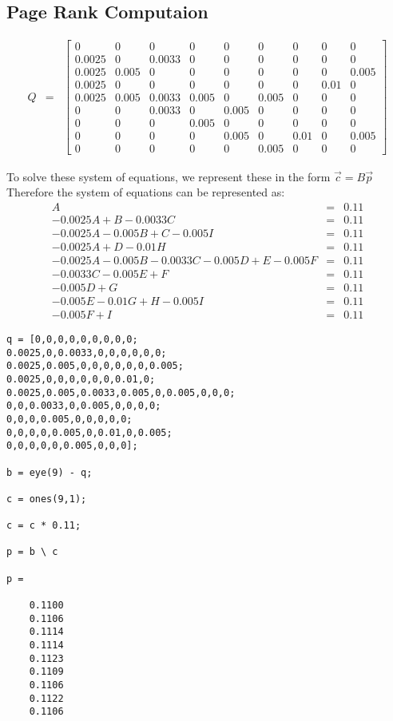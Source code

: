 \documentclass{article}
\begin{document}
\subsection{\textbf{Page Rank Computaion}}
\[
\begin{array}{lcl}Q & = &
\begin{bmatrix} 0 & 0 & 0 & 0 & 0 & 0 & 0 & 0 & 0 \\ 0.0025 & 0 & 0.0033 & 0 & 0 & 0 & 0 & 0 & 0 \\ 0.0025 & 0.005 & 0 & 0 & 0 & 0 & 0 & 0 & 0.005 \\ 0.0025 & 0 & 0 & 0 & 0& 0 & 0 & 0.01 & 0 \\ 0.0025 & 0.005 & 0.0033 & 0.005 & 0 & 0.005 & 0 & 0 & 0 \\ 0 & 0 & 0.0033 & 0 & 0.005 & 0 & 0 & 0 & 0 \\ 0 & 0 & 0 & 0.005 & 0 & 0 & 0 & 0 & 0 \\ 0 & 0 & 0 & 0 & 0.005 & 0 & 0.01 & 0 & 0.005 \\ 0 & 0 & 0 & 0 & 0 & 0.005 & 0 & 0 & 0
\end{bmatrix}
\end{array}
\]

To solve these system of equations, we represent these in the form $\vec{c} = B\vec{p}$
Therefore the system of equations can be represented as:
\[
\begin{array}{rcl}A & = & 0.11 \\ -0.0025A + B - 0.0033C & = & 0.11 \\ -0.0025A - 0.005B + C - 0.005I & = & 0.11 \\ -0.0025A + D - 0.01H & = & 0.11 \\ -0.0025A - 0.005B - 0.0033C -0.005D + E - 0.005F & = &0.11 \\ -0.0033C - 0.005E + F & = & 0.11 \\ -0.005D + G & = & 0.11 \\ -0.005E - 0.01G + H - 0.005I & = & 0.11 \\ -0.005F + I & = & 0.11
\end{array}
\]
\begin{lstlisting}
q = [0,0,0,0,0,0,0,0,0;
0.0025,0,0.0033,0,0,0,0,0,0;
0.0025,0.005,0,0,0,0,0,0,0.005;
0.0025,0,0,0,0,0,0,0.01,0;
0.0025,0.005,0.0033,0.005,0,0.005,0,0,0;
0,0,0.0033,0,0.005,0,0,0,0;
0,0,0,0.005,0,0,0,0,0;
0,0,0,0,0.005,0,0.01,0,0.005;
0,0,0,0,0,0.005,0,0,0];

b = eye(9) - q;

c = ones(9,1);

c = c * 0.11;

p = b \ c

p =

    0.1100
    0.1106
    0.1114
    0.1114
    0.1123
    0.1109
    0.1106
    0.1122
    0.1106
\end{lstlisting}
\end{document}
